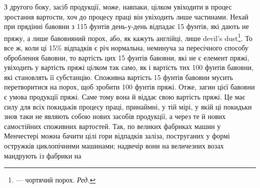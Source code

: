 З другого боку, засіб продукції, може, навпаки, цілком увіходити
в процес зростання вартости, хоч до процесу праці він
увіходить лише частинами. Нехай при прядінні бавовни з 115 фунтів
день-у-день відпадає 15 фунтів, які дають не пряжу,
а лише бавовняний порох, або, як кажуть англійці, лише devil’s
dust\footnote*{
— чортячий порох. \emph{Ред.}
}. То все ж, коли ці 15\% відпадків є річ нормальна, неминуча
за пересічного способу оброблення бавовни, то вартість цих
15 фунтів бавовни, які не є елемент пряжі, увіходить у вартість
пряжі цілком так само, як і вартість тих 100 фунтів бавовни,
які становлять її субстанцію. Споживна вартість 15 фунтів бавовни
мусить перетворитися на порох, щоб зробити 100 фунтів
пряжі. Отже, загин цієї бавовни є умова продукції пряжі. Саме
тому вона й віддає свою вартість пряжі. Це має силу для всіх
покидьків процесу праці, принаймні, у тій мірі, у якій ці покидьки
знов таки не являють собою нових засобів продукції, а через
те й нових самостійних споживних вартостей. Так, по великих
фабриках машин у Менчестері можна бачити цілі гори відпадків
заліза, поструганих у формі остружків циклопічними машинами;
надвечір вони на величезних возах мандрують із фабрики на
\parbreak{}  %
